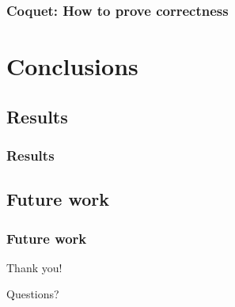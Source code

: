 \documentclass{beamer}
\begin{document}
            \begin{frame}
                \frametitle{Coquet: How to prove correctness}
            \end{frame}



    \section{Conclusions}
    \label{sec:conclusions}
        \frame{\sectionpage}

        \subsection{Results}
        \label{subsec:results}
            \begin{frame}
                \frametitle{Results}
            \end{frame}


        \subsection{Future work}
        \label{subsec:future-work}
            \begin{frame}
                \frametitle{Future work}
            \end{frame}


        \begin{frame}[plain]
            \begin{center}
                \par{\Huge{Thank you!}}
                \vspace{2.0cm}
                \par{\Huge{Questions?}}
            \end{center}
        \end{frame}
\end{document}
